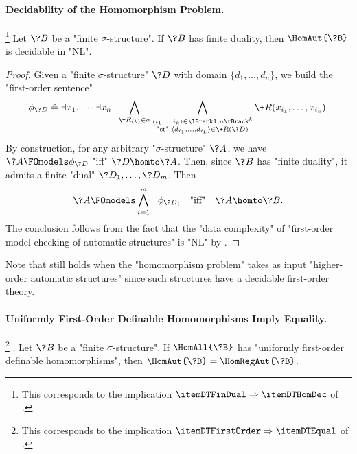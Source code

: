 \paragraph*{Decidability of the Homomorphism Problem.}

\begin{proposition}
	\!\footnote{This corresponds to the implication $\itemDTFinDual \Rightarrow \itemDTHomDec$
	of .}
	\AP\label{prop:dichotomy-FinDual-implies-HomDec}
	Let $\?B$ be a "finite $\sigma$-structure".
	If $\?B$ has finite duality, then $\HomAut{\?B}$ is decidable in "NL".
\end{proposition}

\begin{proof}
	Given a "finite $\sigma$-structure" $\?D$ with domain $\{d_1,\hdots,d_n\}$,
	we build the "first-order sentence"
	\[
		\phi_{\?D} \defeq \exists x_1.\; \cdots \exists x_n.\;
		\bigwedge_{\+R_{(k)} \in \sigma} \bigwedge_{\substack{\tup{i_1,\hdots,i_k} \in \lBrack 1,n\rBrack^k\\\text{"st" }\tup{d_{i_1},\hdots,d_{i_k}} \in \+R(\?D)}}
		\+R(x_{i_1},\hdots,x_{i_k}).
	\]
	By construction, for any arbitrary "$\sigma$-structure" $\?A$, we have $\?A \FOmodels \phi_{\?D}$
	"iff" $\?D \homto \?A$.
	Then, since $\?B$ has "finite duality", it admits a finite "dual"
	$\?D_1,\hdots,\?D_m$.
	Then
	\[
		\?A \FOmodels \bigwedge_{i=1}^m \neg \phi_{\?D_i}
		\quad\text{"iff"}\quad 
		\?A \homto \?B.
	\]
	The conclusion follows from the fact that the "data complexity"
	of "first-order model checking of automatic structures" is "NL"
	by .
\end{proof}

Note that  still holds
when the "homomorphism problem" takes as input "higher-order automatic
structures" since such structures have a decidable first-order theory.


\paragraph*{Uniformly First-Order Definable Homomorphisms Imply Equality.}

\begin{proposition}
	\!\footnote{This corresponds to the implication $\itemDTFirstOrder \Rightarrow \itemDTEqual$
	of .}
	\AP\label{prop:dichotomy-FirstOrder-implies-Equal}.
	Let $\?B$ be a "finite $\sigma$-structure".
	If $\HomAll{\?B}$ has "uniformly first-order definable homomorphisms", then
	$\HomAut{\?B} = \HomRegAut{\?B}$.
\end{proposition}

